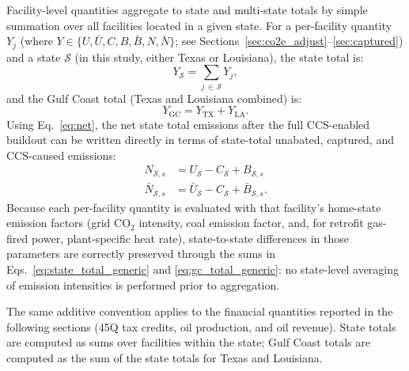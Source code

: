 \documentclass[11pt]{article}
\newcommand{\cotwo}{\ensuremath{\mathrm{CO_2}}}
\begin{document}
Facility-level quantities aggregate to state and multi-state totals by simple summation over all facilities located in a given state.
For a per-facility quantity $Y_j$ (where $Y \in \{U, \bar{U}, C, B, \bar{B}, N, \bar{N}\}$; see Sections~\ref{sec:co2e_adjust}--\ref{sec:captured}) and a state $\mathcal{S}$ (in this study, either Texas or Louisiana), the state total is:
%
\begin{equation}
  Y_{\mathcal{S}} = \sum_{j\,\in\,\mathcal{S}} Y_j,
  \label{eq:state_total_generic}
\end{equation}
%
and the Gulf Coast total (Texas and Louisiana combined) is:
%
\begin{equation}
  Y_{\text{GC}} = Y_{\text{TX}} + Y_{\text{LA}}.
  \label{eq:gc_total_generic}
\end{equation}
%
Using Eq.~\eqref{eq:net}, the net state total emissions after the full CCS-enabled buildout can be written directly in terms of state-total unabated, captured, and CCS-caused emissions:
%
\begin{align}
  N_{\mathcal{S},s} &= U_{\mathcal{S}} - C_{\mathcal{S}} + B_{\mathcal{S},s} \\
    \bar{N}_{\mathcal{S},s} &= \bar{U}_{\mathcal{S}} - C_{\mathcal{S}} + \bar{B}_{\mathcal{S},s}. \label{eq:state_net}
    \label{eq:state_net_co2}
\end{align}
%
Because each per-facility quantity is evaluated with that facility's home-state emission factors (grid \cotwo{} intensity, coal emission factor, and, for retrofit gas-fired power, plant-specific heat rate), state-to-state differences in those parameters are correctly preserved through the sums in Eqs.~\eqref{eq:state_total_generic} and \eqref{eq:gc_total_generic}: no state-level averaging of emission intensities is performed prior to aggregation.

The same additive convention applies to the financial quantities reported in the following sections (45Q tax credits, oil production, and oil revenue). State totals are computed as sums over facilities within the state; Gulf Coast totals are computed as the sum of the state totals for Texas and Louisiana.
\end{document}
